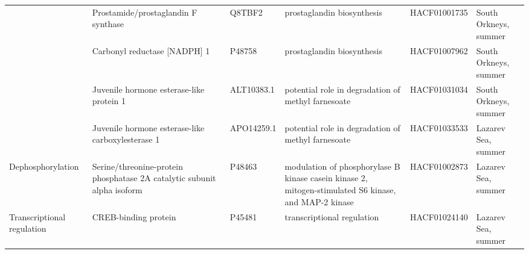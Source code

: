 {\begin{longtable}{@{}L{1.8cm}L{3cm}L{2cm}L{2.5cm}L{1.75cm}L{2.5cm}@{}}
                                       & Prostamide/prostaglandin F synthase                                     & Q8TBF2                                  & prostaglandin biosynthesis                                                                           & HACF01001735       & South Orkneys, summer                \\
                                       & Carbonyl reductase {[}NADPH{]} 1                                        & P48758                                  & prostaglandin biosynthesis                                                                           & HACF01007962       & South Orkneys, summer                \\
                                       & Juvenile hormone esterase-like protein 1                                & ALT10383.1                              & potential role  in degradation of methyl farnesoate                                                  & HACF01031034       & South Orkneys, summer                \\
                                       & Juvenile hormone esterase-like carboxylesterase 1                       & APO14259.1                              & potential role  in degradation of methyl farnesoate                                                  & HACF01033533       & Lazarev Sea, summer                  \\* \midrule
Dephosphorylation                      & Serine/threonine-protein phosphatase 2A catalytic subunit alpha isoform & P48463                                  & modulation of phosphorylase B kinase casein kinase 2, mitogen-stimulated S6 kinase, and MAP-2 kinase & HACF01002873       & Lazarev Sea, summer                  \\* \midrule
Transcriptional regulation             & CREB-binding protein                                                    & P45481                                  & transcriptional regulation                                                                           & HACF01024140       & Lazarev Sea, summer                  \\* \bottomrule
\end{longtable}
}
